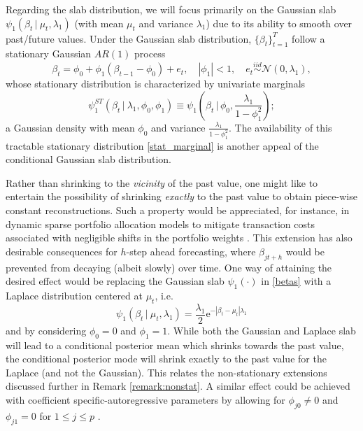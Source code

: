 \documentclass[ba]{imsart}
\numberwithin{equation}{section}
\theoremstyle{plain}
\newcommand{\iid}{\stackrel{iid}{\sim}}
\def\C {\,|\:}
\def\C {\,|\:}
\newcommand{\e}{\mathrm{e}}
\begin{document}
Regarding the slab distribution, we will focus primarily on the Gaussian slab $\psi_1(\beta_{t}\C\mu_t,\lambda_1)$ (with  mean $\mu_t$ and variance $\lambda_1$) due to its ability to smooth over past/future values. %
Under the Gaussian slab distribution, $\{\beta_t\}_{t=1}^T$  follow a stationary Gaussian $AR(1)$ process 
\begin{equation}\label{slab_process}
\beta_{t}=\phi_{0}+\phi_{1}( \beta_{t-1}-\phi_0)+e_{t},\quad |\phi_1|<1,\quad e_{t}\iid \mathcal{N}\left(0,\lambda_1\right),
\end{equation}
whose stationary distribution is characterized by  univariate marginals
\begin{equation}\label{stat_marginal}
\psi_1^{ST}(\beta_{t}\C \lambda_1,\phi_0,\phi_1)\equiv\psi_1\left(\beta_{t}\,\Big|\,\phi_0,\frac{\lambda_1}{1-\phi_1^2}\right);
\end{equation}
a Gaussian density with mean $\phi_0$ and variance $\frac{\lambda_1}{1-\phi_1^2}$.
The availability of this tractable stationary distribution \eqref{stat_marginal} is another appeal of the conditional Gaussian slab distribution. 



{Rather than shrinking  to the {\em vicinity} of the past value, one might like to entertain the possibility of shrinking {\em exactly} to the past value \citep{fused_lasso} to obtain piece-wise constant reconstructions. Such a property  would be appreciated, for instance, in dynamic  sparse  portfolio allocation models to mitigate transaction costs associated with negligible shifts in the portfolio weights \citep{kaoru, brodie, jagan, puelz}. 
This extension has also desirable consequences for $h$-step ahead  forecasting, where $\beta_{j t+h}$ would be prevented from decaying (albeit slowly) over time.
One way of attaining the desired effect would be replacing the Gaussian slab  $\psi_1(\cdot)$ in \eqref{betas} with a Laplace distribution centered at $\mu_t$, i.e.
\begin{equation}\label{conditional_laplace}
\psi_1(\beta_t\C\mu_t,\lambda_1)=\frac{\lambda_1}{2}\e^{-|\beta_t-\mu_t|\lambda_1}
\end{equation}
and by considering $\phi_0=0$ and $\phi_1=1$.
While both the Gaussian and Laplace slab will lead to a conditional posterior mean which shrinks towards the past value, the conditional posterior mode will shrink exactly to the past value for the Laplace (and not the Gaussian). 
This relates  the non-stationary extensions discussed further in Remark \ref{remark:nonstat}.  A similar effect could be achieved with coefficient specific-autoregressive parameters by allowing for $\phi_{j0}\neq 0$ and $\phi_{j1}=0$ for $1\leq j\leq p$ \citep{lopes_mcc_tsay}. 
}
\end{document}
